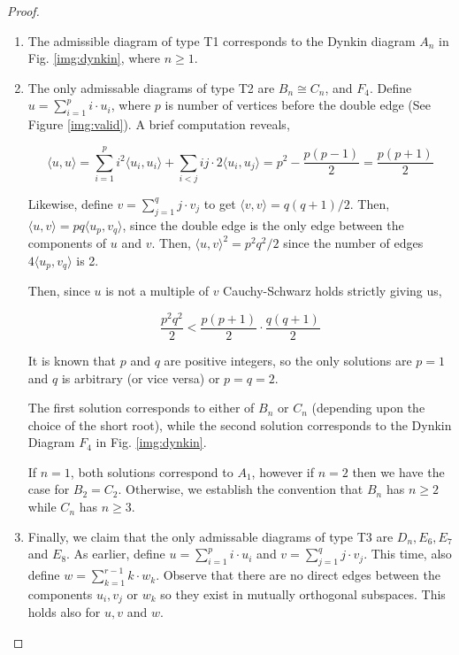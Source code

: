 \begin{proof}
\begin{enumerate}
        \item The admissible diagram of type T1 corresponds to the Dynkin diagram $A_n$ in Fig. \ref{img:dynkin}, where $n \geq 1$.

        \item The only admissable diagrams of type T2 are $B_n \cong C_n$, and $F_4$. Define $u = \sum_{i=1}^{p} i \cdot u_i$, where $p$ is
        number of vertices before the double edge (See Figure \ref{img:valid}). A brief computation reveals,
        
        \begin{equation}
            \label{eq:self_inp}
            \langle u, u \rangle = \sum_{i=1}^p i^2 \langle u_i, u_i \rangle + \sum_{i < j} ij \cdot 2 \langle u_i, u_j \rangle
                = p^2 - \frac{p(p-1)}{2} = \frac{p(p+1)}{2}
        \end{equation}
    
        Likewise, define $v = \sum_{j=1}^q j \cdot v_j$ to get $\langle v, v \rangle = q(q+1)/2$.
        Then, $\langle u, v \rangle = pq \langle u_p , v_q \rangle$, since the double edge is the only edge between the components of
        $u$ and $v$. Then, $\langle u, v \rangle^2 = p^2q^2 / 2$ since the number of edges $4 \langle u_p, v_q \rangle$ is 2.

        Then, since $u$ is not a multiple of $v$ Cauchy-Schwarz holds strictly giving us,

        \begin{equation*}
            \frac{p^2q^2}{2} < \frac{p(p+1)}{2} \cdot \frac{q(q+1)}{2}
        \end{equation*}

        It is known that $p$ and $q$ are positive integers, so the only solutions are $p=1$ and $q$ is
        arbitrary (or vice versa) or $p = q = 2$. \newline

        The first solution corresponds to either of $B_n$ or $C_n$ (depending upon the choice of the short root), while the
        second solution corresponds to the Dynkin Diagram $F_4$ in Fig. \ref{img:dynkin}. \newline

        If $n=1$, both solutions correspond to $A_1$, however if $n=2$ then we have the case  for $B_2 = C_2$. Otherwise,
        we establish the convention that $B_n$ has $n \geq 2$ while $C_n$ has $n\geq 3$.

        
        \item Finally, we claim that the only admissable diagrams of type T3 are $D_n, E_6, E_7$ and $E_8$.
        As earlier, define $u = \sum_{i=1}^p i \cdot u_i$ and $v = \sum_{j=1}^q j \cdot v_j$. This time, also
        define $w = \sum_{k=1}^{r-1} k \cdot w_k$. Observe that there are no direct edges between the components 
        $u_i, v_j$ or $w_k$ so they exist in mutually orthogonal subspaces. This holds also for $u, v$ and $w$. \newline


\end{enumerate}
\end{proof}
